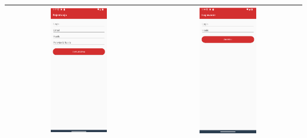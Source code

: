 \begin{tabular}{|c|c|}
    \hline
    \includegraphics[width=0.4\textwidth]{img/imp/widok-reje.png} & \includegraphics[width=0.4\textwidth]{img/imp/widok-log.png} \\ \hline
    \hline
    \end{tabular}

